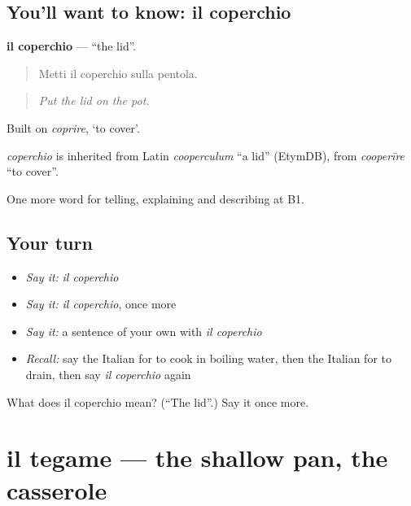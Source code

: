 \subsection*{You'll want to know: il coperchio}
\textbf{il coperchio} — \textquotedblleft{}the lid\textquotedblright{}.

\begin{quote}
Metti il coperchio sulla pentola.
\end{quote}

\begin{quote}
\emph{Put the lid on the pot.}
\end{quote}

Built on \emph{coprire}, ‘to cover’.

\begin{cousinweb}
\emph{coperchio} is inherited from Latin \emph{cooperculum} \textquotedblleft{}a lid\textquotedblright{} (EtymDB), from \emph{cooperīre} \textquotedblleft{}to cover\textquotedblright{}.
\end{cousinweb}

\begin{grammarlens}[title={What you've built}]
One more word for telling, explaining and describing at B1.
\end{grammarlens}

\subsection*{Your turn}
\begin{itemize}
\raggedright
  \item \emph{Say it:} \emph{il coperchio}
  \item \emph{Say it:} \emph{il coperchio}, once more
  \item \emph{Say it:} a sentence of your own with \emph{il coperchio}
  \item \emph{Recall:} say the Italian for to cook in boiling water, then the Italian for to drain, then say \emph{il coperchio} again
\end{itemize}

\begin{tcolorbox}[breakable,colback=teal!4,colframe=teal!35!black,title={Before you move on}]
What does il coperchio mean? (\textquotedblleft{}The lid\textquotedblright{}.) Say it once more.
\end{tcolorbox}
\section[il tegame]{il tegame — the shallow pan, the casserole}

